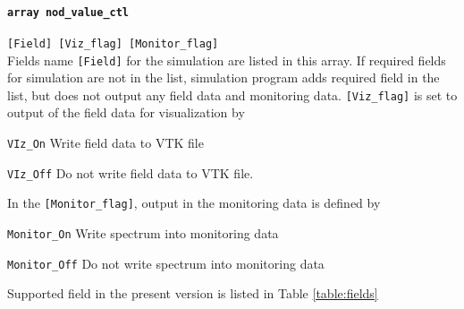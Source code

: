 \paragraph{\tt array nod\_value\_ctl}
\label{href_t:nod_value_ctl}
\verb|[Field] [Viz_flag] [Monitor_flag]| \\
Fields name \verb|[Field]| for the simulation are listed in this array. If required fields for simulation are not in the list, simulation program adds required field in the list, but does not output any field data and monitoring data. \verb|[Viz_flag]| is set to output of the field data for visualization by
%
\begin{description}
\item{\tt VIz\_On}  Write field data to VTK file
\item{\tt VIz\_Off} Do not write field data to VTK file.
\end{description}
%
In the \verb|[Monitor_flag]|, output in the monitoring data is defined by
%
\begin{description}
\item{\tt Monitor\_On}  Write spectrum into monitoring data
\item{\tt Monitor\_Off} Do not write spectrum into monitoring data
\end{description}
%
Supported field in the present version is listed in Table \ref{table:fields}
%
